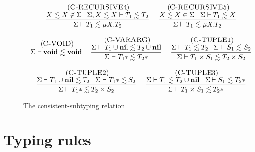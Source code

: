 \begin{figure}[!ht]
\begin{footnotesize}
$$\begin{array}{c}
\begin{array}{c}
\; (\textsc{C-RECURSIVE4})\\
\dfrac{X \lesssim X \not\in \Sigma \;\;\;
       \Sigma, X \lesssim X \vdash T_{1} \lesssim T_{2}}
      {\Sigma \vdash T_{1} \lesssim \mu X.T_{2}}
\end{array}
\;
\begin{array}{c}
\; (\textsc{C-RECURSIVE5})\\
\dfrac{X \lesssim X \in \Sigma \;\;\;
       \Sigma \vdash T_{1} \lesssim X}
      {\Sigma \vdash T_{1} \lesssim \mu X.T_{2}}
\end{array}
\\ \\
\begin{array}{c}
\; (\textsc{C-VOID})\\
\Sigma \vdash \mathbf{void} \lesssim \mathbf{void}
\end{array}
\;
\begin{array}{c}
\; (\textsc{C-VARARG})\\
\dfrac{\Sigma \vdash T_{1} \cup \mathbf{nil} \lesssim T_{2} \cup \mathbf{nil}}
      {\Sigma \vdash T_{1}* \lesssim T_{2}*}
\end{array}
\;
\begin{array}{c}
\; (\textsc{C-TUPLE1})\\
\dfrac{\Sigma \vdash T_{1} \lesssim T_{2} \;\;\;
       \Sigma \vdash S_{1} \lesssim S_{2}}
      {\Sigma \vdash T_{1} \times S_{1} \lesssim T_{2} \times S_{2}}
\end{array}
\\ \\
\begin{array}{c}
\; (\textsc{C-TUPLE2})\\
\dfrac{\Sigma \vdash T_{1} \cup \mathbf{nil} \lesssim T_{2} \;\;\;
       \Sigma \vdash T_{1}* \lesssim S_{2}}
      {\Sigma \vdash T_{1}* \lesssim T_{2} \times S_{2}}
\end{array}
\;
\begin{array}{c}
\; (\textsc{C-TUPLE3})\\
\dfrac{\Sigma \vdash T_{1} \lesssim T_{2} \cup \mathbf{nil} \;\;\;
       \Sigma \vdash S_{1} \lesssim T_{2}*}
      {\Sigma \vdash T_{1} \times S_{1} \lesssim T_{2}*}
\end{array}
\end{array}
$$
\end{footnotesize}
\dend
\caption{The consistent-subtyping relation}
\label{fig:consistent_subtyping}
\end{figure}

\section{Typing rules}

